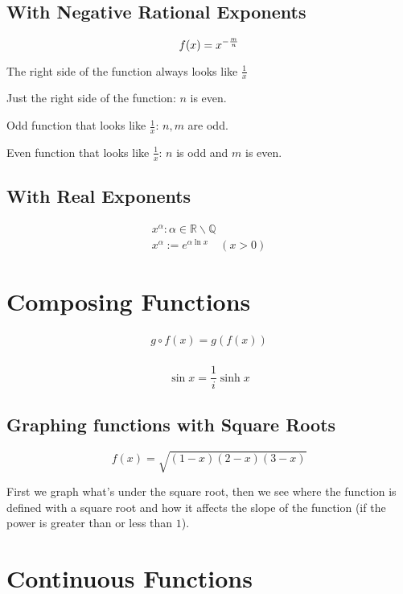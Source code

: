 \documentclass[00_complete]{subfiles}
\begin{document}
\subsection{With Negative Rational Exponents}

$$
    f(x)=x^{-\frac{m}{n}} \\
$$

The right side of the function always looks like $\frac{1}{x}$

Just the right side of the function: $n$ is even.

Odd function that looks like $\frac{1}{x}$: $n,m$ are odd.

Even function that looks like $\frac{1}{x}$: $n$ is odd and $m$ is even.

\subsection{With Real Exponents}

$$\begin{gathered}
    x^\alpha : \alpha \in \mathbb{R} \backslash \mathbb{Q} \\
    x^\alpha := e^{\alpha \ln x} \quad (x > 0)
\end{gathered}
$$

\section{Composing Functions}

$$
\begin{gathered}
    g \circ f(x) = g(f(x)) \\
\end{gathered}
$$

\begin{note}
$$
\sin x  = \frac{1}{i}\sinh x
$$
\end{note}

\subsection{Graphing functions with Square Roots}

$$f(x)=\sqrt{(1-x)(2-x)(3-x)}$$

First we graph what's under the square root, then we see where the function is
defined with a square root and how it affects the slope of the function (if the
power is greater than or less than $1$).

\section{Continuous Functions}
\end{document}
